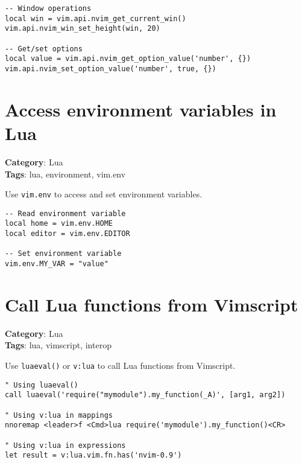 {{{{{{\begin{Exa*}{}
\begin{Verbatim}[fontsize=\footnotesize, breaklines, breakanywhere]
-- Window operations
local win = vim.api.nvim_get_current_win()
vim.api.nvim_win_set_height(win, 20)

-- Get/set options
local value = vim.api.nvim_get_option_value('number', {})
vim.api.nvim_set_option_value('number', true, {})
\end{Verbatim}
\end{Exa*}

\section{Access environment variables in Lua}

\textbf{Category}: Lua\\ \textbf{Tags}: lua, environment, vim.env
\vspace{0.5cm}

Use {\footnotesize \Verb§vim.env§} to access and set environment variables.

\begin{Exa*}{}
\begin{Verbatim}[fontsize=\footnotesize, breaklines, breakanywhere]
-- Read environment variable
local home = vim.env.HOME
local editor = vim.env.EDITOR

-- Set environment variable
vim.env.MY_VAR = "value"
\end{Verbatim}
\end{Exa*}

\section{Call Lua functions from Vimscript}

\textbf{Category}: Lua\\ \textbf{Tags}: lua, vimscript, interop
\vspace{0.5cm}

Use {\footnotesize \Verb§luaeval()§} or {\footnotesize \Verb§v:lua§} to call Lua functions from Vimscript.

\begin{Exa*}{}
\begin{Verbatim}[fontsize=\footnotesize, breaklines, breakanywhere]
" Using luaeval()
call luaeval('require("mymodule").my_function(_A)', [arg1, arg2])

" Using v:lua in mappings
nnoremap <leader>f <Cmd>lua require('mymodule').my_function()<CR>

" Using v:lua in expressions
let result = v:lua.vim.fn.has('nvim-0.9')
\end{Verbatim}
\end{Exa*}

}}}}}}
